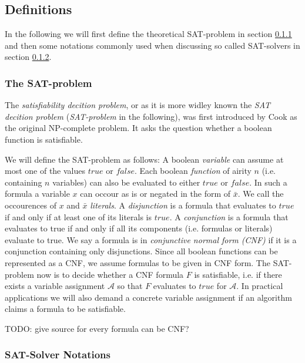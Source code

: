 \documentclass[12pt,a4paper,twoside]{scrartcl}
\numberwithin{equation}{section}
\begin{document}
\subsection{Definitions}
\label{sec:definitions}

In the following we will first define the theoretical SAT-problem in section \ref{sec:SATproblem} and then some notations commonly used when discussing so called SAT-solvers in section \ref{sec:solverNotation}.

\subsubsection{The SAT-problem}
\label{sec:SATproblem}

The \textit{satisfiability decition problem}, or as it is more widley known the \textit{SAT decition problem} (\textit{SAT-problem} in the following), was first introduced by Cook \cite{satProblem} as the original NP-complete problem. It asks the question whether a boolean function is satisfiable.

We will define the SAT-problem as follows:
A boolean \textit{variable} can assume at most one of the values $true$ or $false$. Each boolean \textit{function} of airity $n$ (i.e. containing $n$ variables) can also be evaluated to either $true$ or $false$. In such a formula a variable $x$ can occour as is or negated in the form of $\bar{x}$. We call the occourences of $x$ and $\bar{x}$ \textit{literals}. A \textit{disjunction} is a formula that evaluates to $true$ if and only if at least one of its literals is $true$. A \textit{conjunction} is a formula that evaluates to true if and only if all its components (i.e. formulas or literals) evaluate to true. We say a formula is in \textit{conjunctive normal form (CNF)} if it is a conjunction containing only disjunctions. Since all boolean functions can be represented as a CNF, we assume formulas to be given in CNF form. 
The SAT-problem now is to decide whether a CNF formula $F$ is satisfiable, i.e. if there exists a variable assignment $\mathcal{A}$ so that $F$ evaluates to $true$ for $\mathcal{A}$. In practical applications we will also demand a concrete variable assignment if an algorithm claims a formula to be satisfiable.


TODO: give source for every formula can be CNF?

\subsubsection{SAT-Solver Notations}
\label{sec:solverNotation}
\end{document}

